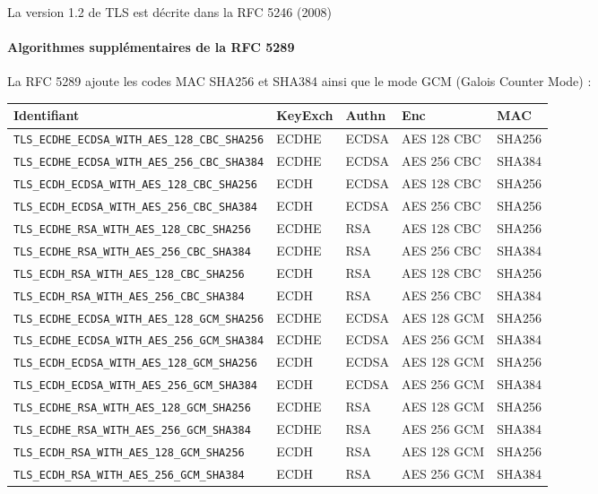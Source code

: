 \documentclass[a4paper,11pt,french]{article}
\begin{document}
La version 1.2 de TLS est décrite dans la RFC 5246 (2008)

\paragraph{Algorithmes supplémentaires de la RFC 5289} 
La RFC 5289 ajoute les codes MAC SHA256 et SHA384 ainsi que le mode GCM (Galois Counter Mode) :
\begin{center}
\begin{tabularx}{17cm}{|l|l|l|X|l|}
\hline
\textbf{Identifiant} & \textbf{KeyExch} & \textbf{Authn}& \textbf{Enc}& \textbf{MAC}\\
\hline
\verb+TLS_ECDHE_ECDSA_WITH_AES_128_CBC_SHA256+&ECDHE&ECDSA&AES 128 CBC&SHA256\\
\hline
\verb+TLS_ECDHE_ECDSA_WITH_AES_256_CBC_SHA384+&ECDHE&ECDSA&AES 256 CBC&SHA384\\
\hline
\verb+TLS_ECDH_ECDSA_WITH_AES_128_CBC_SHA256+&ECDH&ECDSA&AES 128 CBC&SHA256\\
\hline
\verb+TLS_ECDH_ECDSA_WITH_AES_256_CBC_SHA384+&ECDH&ECDSA&AES 256 CBC&SHA256\\
\hline
\verb+TLS_ECDHE_RSA_WITH_AES_128_CBC_SHA256+&ECDHE&RSA&AES 128 CBC&SHA256\\
\hline
\verb+TLS_ECDHE_RSA_WITH_AES_256_CBC_SHA384+&ECDHE&RSA&AES 256 CBC&SHA384\\
\hline
\verb+TLS_ECDH_RSA_WITH_AES_128_CBC_SHA256+&ECDH&RSA&AES 128 CBC&SHA256\\
\hline
\verb+TLS_ECDH_RSA_WITH_AES_256_CBC_SHA384+&ECDH&RSA&AES 256 CBC&SHA384\\
\hline
\verb+TLS_ECDHE_ECDSA_WITH_AES_128_GCM_SHA256+&ECDHE&ECDSA&AES 128 GCM&SHA256\\
\hline
\verb+TLS_ECDHE_ECDSA_WITH_AES_256_GCM_SHA384+&ECDHE&ECDSA&AES 256 GCM&SHA384\\
\hline
\verb+TLS_ECDH_ECDSA_WITH_AES_128_GCM_SHA256+&ECDH&ECDSA&AES 128 GCM&SHA256\\
\hline
\verb+TLS_ECDH_ECDSA_WITH_AES_256_GCM_SHA384+&ECDH&ECDSA&AES 256 GCM&SHA384\\
\hline
\verb+TLS_ECDHE_RSA_WITH_AES_128_GCM_SHA256+&ECDHE&RSA&AES 128 GCM&SHA256\\
\hline
\verb+TLS_ECDHE_RSA_WITH_AES_256_GCM_SHA384+&ECDHE&RSA&AES 256 GCM&SHA384\\
\hline
\verb+TLS_ECDH_RSA_WITH_AES_128_GCM_SHA256+&ECDH&RSA&AES 128 GCM&SHA256\\
\hline
\verb+TLS_ECDH_RSA_WITH_AES_256_GCM_SHA384+&ECDH&RSA&AES 256 GCM&SHA384\\
\hline
\end{tabularx}
\end{center}
\end{document}
